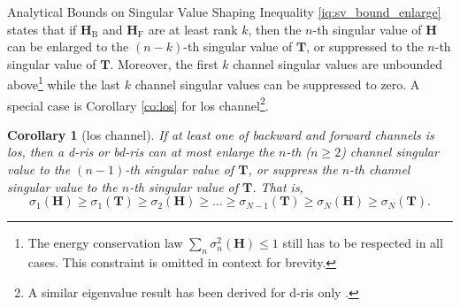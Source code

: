 \documentclass[journal]{IEEEtran}
\newtheorem{corollary}{Corollary}[proposition]
\begin{document}
\begin{section}{Analytical Bounds on Singular Value Shaping}
		Inequality \eqref{iq:sv_bound_enlarge} states that
		if $\mathbf{H}_\mathrm{B}$ and $\mathbf{H}_\mathrm{F}$ are at least rank $k$, then
		the $n$-th singular value of $\mathbf{H}$ can be enlarged to the $(n-k)$-th singular value of $\mathbf{T}$, or suppressed to the $n$-th singular value of $\mathbf{T}$.
		Moreover, the first $k$ channel singular values are unbounded above\footnote{The energy conservation law $\sum_n \sigma_n^2(\mathbf{H}) \le 1$ still has to be respected in all cases. This constraint is omitted in context for brevity.} while the last $k$ channel singular values can be suppressed to zero.
		A special case is Corollary \ref{co:los} for \gls{los} channel\footnote{A similar eigenvalue result has been derived for \gls{d}-\gls{ris} only \cite{Semmler2023}.}.





		\begin{corollary}[\gls{los} channel\label{co:los}]
			If at least one of backward and forward channels is \gls{los}, then a \gls{d}-\gls{ris} or \gls{bd}-\gls{ris} can at most enlarge the $n$-th ($n \ge 2$) channel singular value to the $(n-1)$-th singular value of $\mathbf{T}$, or suppress the $n$-th channel singular value to the $n$-th singular value of $\mathbf{T}$.
			That is,
			\begin{equation}
				\sigma_1(\mathbf{H}) \ge \sigma_1(\mathbf{T}) \ge {\sigma_2(\mathbf{H})} \ge \ldots \ge \sigma_{N-1}(\mathbf{T}) \ge {\sigma_N(\mathbf{H})} \ge \sigma_N(\mathbf{T}).
				\label{iq:sv_bound_los}
			\end{equation}
		\end{corollary}


\end{section}
\end{document}

